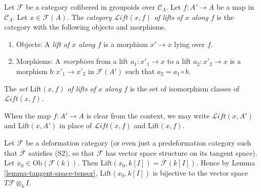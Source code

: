 \begin{definition}
\label{definition-lifts}
Let $\mathcal{F}$ be a category cofibered in groupoids over $\mathcal 
C_\Lambda$.  Let $f: A' \to A$ be a map in $\mathcal{C}_\Lambda$.  
Let $x \in \mathcal{F}(A)$.  The {\it category $\mathcal{L}\textit{ift}(x,f)$ 
of lifts of $x$ along $f$} is the category with the following objects and 
morphisms. 
\begin{enumerate}
\item Objects: A {\it lift of $x$ along $f$} is a morphism $x' \to x$ 
lying over $f$.  
\item Morphisms: A {\it morphism} from a lift $a_1: x'_{1} \to x$ to a 
lift $a_2: x'_{2} \to x$ is a morphism $b: x'_1 \to x'_2$ in 
$\mathcal{F}(A')$ such that $a_2 = a_1 \circ b$.
\end{enumerate}
The {\it set $\text{Lift}(x,f)$ of lifts of $x$ along $f$} is the set of 
isomorphism classes of $\mathcal{L}\textit{ift}(x,f)$.
\end{definition}

\begin{remark}
\label{remark-omit-arrow}
When the map $f: A' \to A$ is clear from the context, we may write 
$\mathcal{L}\textit{ift}(x,A')$ and $\text{Lift}(x,A')$ in place of 
$\mathcal{L}\textit{ift}(x,f)$ and $\text{Lift}(x,f)$. 
\end{remark}

\begin{remark}
\label{remark-tangent-space-lifting}
Let $\mathcal{F}$ be a deformation category (or even just a predeformation 
category such that $\overline{\mathcal{F}}$ satisfies (S2), so that $\mathcal{F}$ 
has vector space structure on its tangent space).  Let $x_0 \in 
\text{Ob}(\mathcal{F}(k))$.  Then $\text{Lift}(x_0, k[I]) = 
\overline{\mathcal{F}}(k[I])$. Hence by Lemma \ref{lemma-tangent-space-tensor}, 
$\text{Lift}(x_0, k[I])$ is bijective to the vector space $T\mathcal{F} 
\otimes_{k} I$.
\end{remark}

